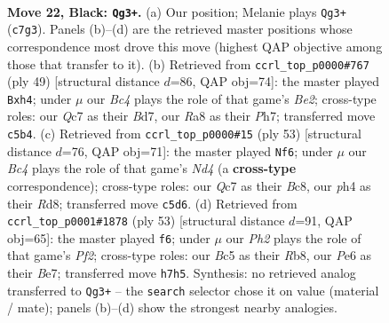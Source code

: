 \documentclass[11pt]{article}
\begin{document}
\clearpage

\begin{figure}[p]\centering
\begin{subfigure}{0.46\textwidth}\centering
\resizebox{\linewidth}{!}{%
\newchessgame
\chessboard[
  setfen={r5k1/ppq1r2p/R3p1p1/2bB4/6PP/1N6/1P3P2/2BQ1RK1 b - - 0 22},
  showmover=false,
  pgfstyle=straightmove, color=movearrow, markmove={c7-g3}
]}
\caption{}
\end{subfigure}\hfill
\begin{subfigure}{0.46\textwidth}\centering
\resizebox{\linewidth}{!}{%
\newchessgame
\chessboard[
  setfen={1r4k1/3bb1pp/pq1pp3/3RP3/7B/2N5/1PQ3PP/2K1R3 b - - 0 25},
  showmover=false,
  pgfstyle=straightmove, color=movearrow, markmove={e7-h4}
]}
\caption{}
\end{subfigure}
\\[4pt]
\begin{subfigure}{0.46\textwidth}\centering
\resizebox{\linewidth}{!}{%
\newchessgame
\chessboard[
  setfen={2brr1k1/pp3p2/6qp/3n2pR/3N2P1/5B2/P6P/R1B3QK b - - 0 27},
  showmover=false,
  pgfstyle=straightmove, color=movearrow, markmove={d5-f6}
]}
\caption{}
\end{subfigure}\hfill
\begin{subfigure}{0.46\textwidth}\centering
\resizebox{\linewidth}{!}{%
\newchessgame
\chessboard[
  setfen={1r1r2k1/4bpp1/p1qp4/3Rp1B1/2p1P3/5P2/PPP4P/K1Q3R1 b - - 0 27},
  showmover=false,
  pgfstyle=straightmove, color=movearrow, markmove={f7-f6}
]}
\caption{}
\end{subfigure}
\caption{\textbf{Move 22, Black: \texttt{Qg3+}.} (a) Our position; Melanie plays \texttt{Qg3+} (\texttt{c7g3}). Panels (b)--(d) are the retrieved master positions whose correspondence most drove this move (highest QAP objective among those that transfer to it). (b) Retrieved from \texttt{ccrl\_top\_p0000\#767} (ply 49) [structural distance $d$=86, QAP obj=74]: the master played \texttt{Bxh4}; under $\mu$ our \emph{Bc4} plays the role of that game's \emph{Be2}; cross-type roles: our \emph{Q}c7 as their \emph{B}d7, our \emph{R}a8 as their \emph{P}h7; transferred move \texttt{c5b4}. (c) Retrieved from \texttt{ccrl\_top\_p0000\#15} (ply 53) [structural distance $d$=76, QAP obj=71]: the master played \texttt{Nf6}; under $\mu$ our \emph{Bc4} plays the role of that game's \emph{Nd4} (a \textbf{cross-type} correspondence); cross-type roles: our \emph{Q}c7 as their \emph{B}c8, our \emph{p}h4 as their \emph{R}d8; transferred move \texttt{c5d6}. (d) Retrieved from \texttt{ccrl\_top\_p0001\#1878} (ply 53) [structural distance $d$=91, QAP obj=65]: the master played \texttt{f6}; under $\mu$ our \emph{Ph2} plays the role of that game's \emph{Pf2}; cross-type roles: our \emph{B}c5 as their \emph{R}b8, our \emph{P}e6 as their \emph{B}e7; transferred move \texttt{h7h5}. Synthesis: no retrieved analog transferred to \texttt{Qg3+} -- the \texttt{search} selector chose it on value (material / mate); panels (b)--(d) show the strongest nearby analogies.}
\label{fig:thought-m43}
\end{figure}
\end{document}
